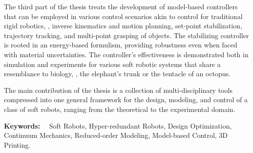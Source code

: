 The third part of the thesis treats the development of model-based controllers that can be employed in various control scenarios akin to control for traditional rigid robotics, \eg, inverse kinematics and motion planning, set-point stabilization, trajectory tracking, and multi-point grasping of objects. The stabilizing controller is rooted in an energy-based formulism, providing robustness even when faced with material uncertainties. The controller's effectiveness is demonstrated both in simulation and experiments for various soft robotic systems that share a resemblance to biology, \eg, the elephant's trunk or the tentacle of an octopus.

The main contribution of the thesis is a collection of multi-disciplinary tools compressed into one general framework for the design, modeling, and control of a class of soft robots, ranging from the theoretical to the experimental domain.

\vspace*{5pt}\noindent
\textbf{Keywords:} \ \ Soft Robots, Hyper-redundant Robots, Design Optimization, Continuum Mechanics, Reduced-order Modeling, Model-based Control, 3D Printing.
